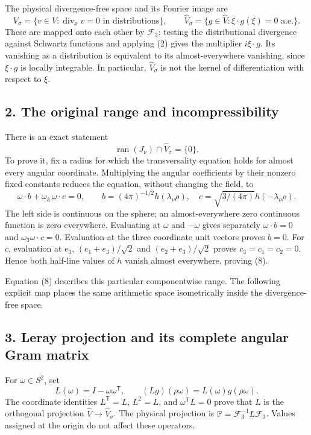 The physical divergence-free space and its Fourier image are \[
V_\sigma=\{v\in V:\operatorname{div}_xv=0\text{ in distributions}\},
\qquad
\widehat V_\sigma=\{g\in\widehat V:\xi\cdot g(\xi)=0\text{ a.e.}\}.
\tag{7}
\] These are mapped onto each other by \(\mathcal F_3\): testing the distributional divergence against Schwartz functions and applying (2) gives the multiplier \(i\xi\cdot g\). Its vanishing as a distribution is equivalent to its almost-everywhere vanishing, since \(\xi\cdot g\) is locally integrable. In particular, \(\widehat V_\sigma\) is not the kernel of differentiation with respect to \(\xi\).

\subsection*{2. The original range and incompressibility}

There is an exact statement \[
\operatorname{ran}(J_\nu)\cap\widehat V_\sigma=\{0\}.
\tag{8}
\] To prove it, fix a radius for which the transversality equation holds for almost every angular coordinate. Multiplying the angular coefficients by their nonzero fixed constants reduces the equation, without changing the field, to \[
\omega\cdot b+\omega_3\,\omega\cdot c=0,
\qquad
b=(4\pi)^{-1/2}h(\lambda_\nu\rho),\quad
c=\sqrt{3/(4\pi)}h(-\lambda_\nu\rho).
\tag{9}
\] The left side is continuous on the sphere; an almost-everywhere zero continuous function is zero everywhere. Evaluating at \(\omega\) and \(-\omega\) gives separately \(\omega\cdot b=0\) and \(\omega_3\omega\cdot c=0\). Evaluation at the three coordinate unit vectors proves \(b=0\). For \(c\), evaluation at \(e_3\), \((e_1+e_3)/\sqrt2\) and \((e_2+e_3)/\sqrt2\) proves \(c_3=c_1=c_2=0\). Hence both half-line values of \(h\) vanish almost everywhere, proving (8).

Equation (8) describes this particular componentwise range. The following explicit map places the same arithmetic space isometrically inside the divergence-free space.

\subsection*{3. Leray projection and its complete angular Gram matrix}

For \(\omega\in S^2\), set \[
L(\omega)=I-\omega\omega^{\mathsf T},\qquad
(Lg)(\rho\omega)=L(\omega)g(\rho\omega).
\tag{10}
\] The coordinate identities \(L^{\mathsf T}=L\), \(L^2=L\), and \(\omega^{\mathsf T}L=0\) prove that \(L\) is the orthogonal projection \(\widehat V\to\widehat V_\sigma\). The physical projection is \(\mathbb P=\mathcal F_3^{-1}L\mathcal F_3\). Values assigned at the origin do not affect these operators.

